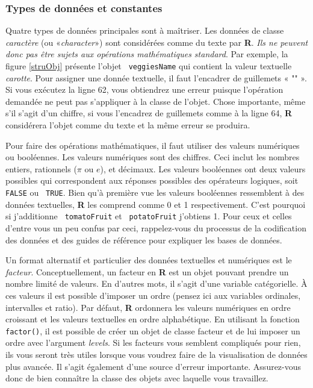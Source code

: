 \documentclass[10.5pt,a4paper]{article}
\newcommand{\rcode}[1]{\texttt{\color{rstudio} #1}}
\begin{document}
    \subsubsection{Types de données et constantes}
    Quatre types de données principales sont à maîtriser. Les données de classe \emph{caractère} (ou «\emph{character}») sont considérées comme du texte par \textbf{R}. \emph{Ils ne peuvent donc pas être sujets aux opérations mathématiques standard}. Par exemple, la figure \ref{struObj} présente l'objet \rcode{veggiesName} qui contient la valeur textuelle \emph{carotte}. Pour assigner une donnée textuelle, il faut l'encadrer de guillemets « "" ». Si vous exécutez la ligne 62, vous obtiendrez une erreur puisque l'opération demandée ne peut pas s'appliquer à la classe de l'objet. Chose importante, même s'il s'agit d'un chiffre, si vous l'encadrez de guillemets comme à la ligne 64, \textbf{R} considérera l'objet comme du texte et la même erreur se produira. 
    
    Pour faire des opérations mathématiques, il faut utiliser des valeurs numériques ou booléennes. Les valeurs numériques sont des chiffres. Ceci inclut les nombres entiers, rationnels ($\pi$ ou $e$), et décimaux. Les valeurs booléennes ont deux valeurs possibles qui correspondent aux réponses possibles des opérateurs logiques, soit \rcode{FALSE} ou \rcode{TRUE}. Bien qu'à première vue les valeurs booléennes ressemblent à des données textuelles, \textbf{R} les comprend comme 0 et 1 respectivement. C'est pourquoi si j'additionne \rcode{tomatoFruit} et \rcode{potatoFruit} j'obtiens 1. Pour ceux et celles d'entre vous un peu confus par ceci, rappelez-vous du processus de la codification des données et des guides de référence pour expliquer les bases de données.
    
    Un format alternatif et particulier des données textuelles et numériques est le \emph{facteur}. Conceptuellement, un facteur en \textbf{R} est un objet pouvant prendre un nombre limité de valeurs. En d'autres mots, il s'agit d'une variable catégorielle. À ces valeurs il est possible d'imposer un ordre (pensez ici aux variables ordinales, intervalles et ratio). Par défaut, \textbf{R} ordonnera les valeurs numériques en ordre croissant et les valeurs textuelles en ordre alphabétique. En utilisant la fonction \rcode{factor()}, il est possible de créer un objet de classe facteur et de lui imposer un ordre avec l'argument \emph{levels}. Si les facteurs vous semblent compliqués pour rien, ils vous seront très utiles lorsque vous voudrez faire de la visualisation de données plus avancée. Il s'agit également d'une source d'erreur importante. Assurez-vous donc de bien connaître la classe des objets avec laquelle vous travaillez.
    
\end{document}
